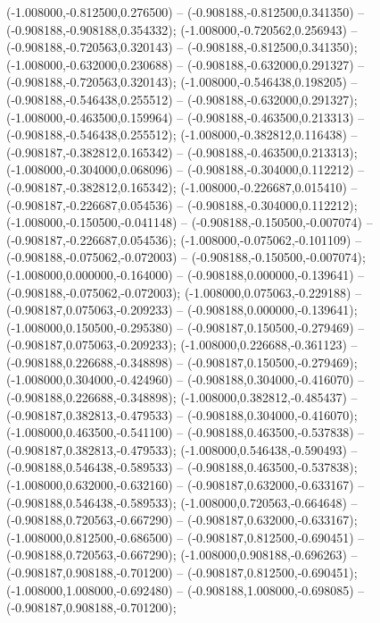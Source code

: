  (-1.008000,-0.812500,0.276500) -- (-0.908188,-0.812500,0.341350) -- (-0.908188,-0.908188,0.354332);
 (-1.008000,-0.720562,0.256943) -- (-0.908188,-0.720563,0.320143) -- (-0.908188,-0.812500,0.341350);
 (-1.008000,-0.632000,0.230688) -- (-0.908188,-0.632000,0.291327) -- (-0.908188,-0.720563,0.320143);
 (-1.008000,-0.546438,0.198205) -- (-0.908188,-0.546438,0.255512) -- (-0.908188,-0.632000,0.291327);
 (-1.008000,-0.463500,0.159964) -- (-0.908188,-0.463500,0.213313) -- (-0.908188,-0.546438,0.255512);
 (-1.008000,-0.382812,0.116438) -- (-0.908187,-0.382812,0.165342) -- (-0.908188,-0.463500,0.213313);
 (-1.008000,-0.304000,0.068096) -- (-0.908188,-0.304000,0.112212) -- (-0.908187,-0.382812,0.165342);
 (-1.008000,-0.226687,0.015410) -- (-0.908187,-0.226687,0.054536) -- (-0.908188,-0.304000,0.112212);
 (-1.008000,-0.150500,-0.041148) -- (-0.908188,-0.150500,-0.007074) -- (-0.908187,-0.226687,0.054536);
 (-1.008000,-0.075062,-0.101109) -- (-0.908188,-0.075062,-0.072003) -- (-0.908188,-0.150500,-0.007074);
 (-1.008000,0.000000,-0.164000) -- (-0.908188,0.000000,-0.139641) -- (-0.908188,-0.075062,-0.072003);
 (-1.008000,0.075063,-0.229188) -- (-0.908187,0.075063,-0.209233) -- (-0.908188,0.000000,-0.139641);
 (-1.008000,0.150500,-0.295380) -- (-0.908187,0.150500,-0.279469) -- (-0.908187,0.075063,-0.209233);
 (-1.008000,0.226688,-0.361123) -- (-0.908188,0.226688,-0.348898) -- (-0.908187,0.150500,-0.279469);
 (-1.008000,0.304000,-0.424960) -- (-0.908188,0.304000,-0.416070) -- (-0.908188,0.226688,-0.348898);
 (-1.008000,0.382812,-0.485437) -- (-0.908187,0.382813,-0.479533) -- (-0.908188,0.304000,-0.416070);
 (-1.008000,0.463500,-0.541100) -- (-0.908188,0.463500,-0.537838) -- (-0.908187,0.382813,-0.479533);
 (-1.008000,0.546438,-0.590493) -- (-0.908188,0.546438,-0.589533) -- (-0.908188,0.463500,-0.537838);
 (-1.008000,0.632000,-0.632160) -- (-0.908187,0.632000,-0.633167) -- (-0.908188,0.546438,-0.589533);
 (-1.008000,0.720563,-0.664648) -- (-0.908188,0.720563,-0.667290) -- (-0.908187,0.632000,-0.633167);
 (-1.008000,0.812500,-0.686500) -- (-0.908187,0.812500,-0.690451) -- (-0.908188,0.720563,-0.667290);
 (-1.008000,0.908188,-0.696263) -- (-0.908187,0.908188,-0.701200) -- (-0.908187,0.812500,-0.690451);
 (-1.008000,1.008000,-0.692480) -- (-0.908188,1.008000,-0.698085) -- (-0.908187,0.908188,-0.701200);
